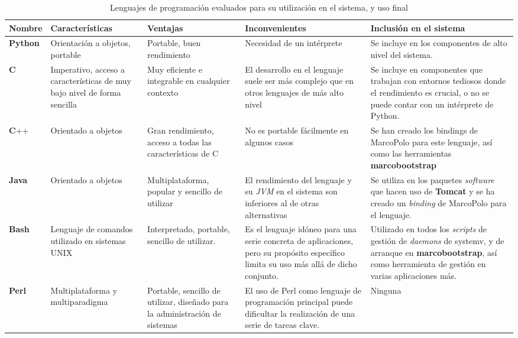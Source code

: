 \begin{landscape}
\begin{table}[H]
\begin{tabular}{|p{1.4cm}|p{3.7cm}|p{3.5cm}|p{5cm}|p{7.5cm}|}
\hline
\textbf{Nombre} & \textbf{Características} & \textbf{Ventajas} & \textbf{Inconvenientes} & \textbf{Inclusión en el sistema}\\ \hline

\textbf{Python} & Orientación a objetos, portable & Portable, buen rendimiento & Necesidad de un intérprete & Se incluye en los componentes de alto nivel del sistema.\\ \hline

\textbf{C} & Imperativo, acceso a características de muy bajo nivel de forma sencilla & Muy eficiente e integrable en cualquier contexto & El desarrollo en el lenguaje suele ser más complejo que en otros lenguajes de más alto nivel & Se incluye en componentes que trabajan con entornos tediosos donde el rendimiento es crucial, o no se puede contar con un intérprete de Python. \\ \hline

\textbf{C}++ & Orientado a objetos & Gran rendimiento, acceso a todas las características de C & No es portable fácilmente en algunos casos & Se han creado los bindings de MarcoPolo para este lenguaje, así como las herramientas \textbf{marcobootstrap}\\ \hline

\textbf{Java} & Orientado a objetos & Multiplataforma, popular y sencillo de utilizar & El rendimiento del lenguaje y su \textit{JVM} en el sistema son inferiores al de otras alternativas & Se utiliza en los paquetes \textit{software} que hacen uso de \textbf{Tomcat} y se ha creado un \textit{binding} de MarcoPolo para el lenguaje.\\ \hline

\textbf{Bash} & Lenguaje de comandos utilizado en sistemas UNIX & Interpretado, portable, sencillo de utilizar. & Es el lenguaje idóneo para una serie  concreta de aplicaciones, pero su propósito específico limita su uso más allá de dicho conjunto. & Utilizado en todos los \textit{scripts} de gestión de \textit{daemons} de systemv, y de arranque en \textbf{marcobootstrap}, así como herramienta de gestión en varias aplicaciones más.\\ \hline

\textbf{Perl} & Multiplataforma y multiparadigma & Portable, sencillo de utilizar, diseñado para la administración de sistemas & El uso de Perl como lenguaje de programación principal puede dificultar la realización de una serie de tareas clave. & Ninguna\\ \hline
\end{tabular}
\caption{Lenguajes de programación evaluados para su utilización en el sistema, y uso final}
\end{table}
\end{landscape}

